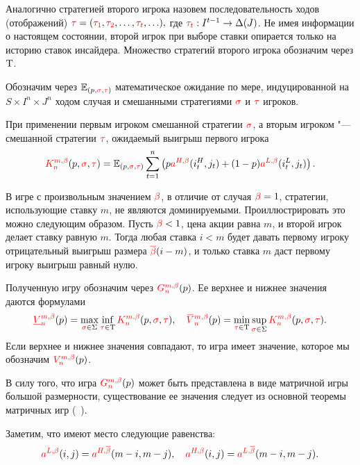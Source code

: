 {Аналогично стратегией второго игрока назовем последовательность ходов (отображений) 
$\textcolor{red}{\tau} = (\textcolor{red}{\tau_{1}}, \textcolor{red}{\tau_{2}}, \ldots, \textcolor{red}{\tau_{t}}, \ldots),$ где 
$\textcolor{red}{\tau_{t}}: I^{t-1} \rightarrow \Delta(J)$.
Не имея информации о настоящем состоянии, второй игрок при выборе ставки опирается только на историю ставок инсайдера.
Множество стратегий второго игрока обозначим через $\mathrm{T}$.

Обозначим через $\operatorname{\mathbb{E}}_{(p,\textcolor{red}{\sigma},\textcolor{red}{\tau})}$ математическое ожидание по мере, индуцированной на $S \times I^n \times J^n$ ходом случая и смешанными стратегиями $\textcolor{red}{\sigma}$ и $\textcolor{red}{\tau}$ игроков.

При применении первым игроком смешанной стратегии $\textcolor{red}{\sigma}$, а вторым игроком "--- смешанной стратегии $\textcolor{red}{\tau}$, ожидаемый выигрыш первого игрока
\begin{equation}
  \label{ch1:eq:firstPlayerPayoff}
  \K*{n}(p, \sigmar, \taur) = \E_{(p,\sigmar,\taur)} \sum_{t=1}^n
  \left(
    p \as[H](i_t^H, j_t) + (1 - p)\as[L](i_t^L, j_t)
  \right).
\end{equation}

\begin{remark}
  В игре с произвольным значением $\textcolor{red}{\beta}$, в отличие от случая $\textcolor{red}{\beta} = 1$, стратегии, использующие ставку $m$, не являются доминируемыми.
  Проиллюстрировать это можно следующим образом.
  Пусть $\textcolor{red}{\beta} < 1$, цена акции равна $m$, и второй игрок делает ставку равную $m$.
  Тогда любая ставка $i < m$ будет давать первому игроку отрицательный выигрыш размера $\textcolor{red}{{\overline{\beta}}} (i - m)$, и только ставка $m$ даст первому игроку выигрыш равный нулю. 
\end{remark}

Полученную игру обозначим через $\theG*{n}(p)$. Ее верхнее и нижнее значения даются формулами
\begin{equation*}
  \LowV*{n}(p) = \max_{\sigmar \in \Sigma} \inf_{\taur \in \Tau}
  \K*{n}(p, \sigmar, \taur), \quad
  \HighV*{n}(p) = \min_{\taur \in \Tau} \sup_{\sigmar \in \Sigma}
  \K*{n}(p, \sigmar, \taur).
\end{equation*}
Если верхнее и нижнее значения совпадают, то игра имеет значение, которое мы обозначим $\V*{n}(p)$.

\begin{remark}
  В силу того, что игра $\theG*{n}(p)$ может быть представлена в виде матричной игры большой размерности, существование ее значения следует из основной теоремы матричных игр (\seename~\cite{morozov08}).
\end{remark}

Заметим, что имеют место следующие равенства:
\begin{equation}
  \label{ch1:eq:payoff-symmetry}
  \as[L][\Co](i, j) = \as[H][\DCo](m-i, m-j), \quad
  \as[H][\Co](i, j) = \as[L][\DCo](m-i, m-j).
\end{equation}

}
